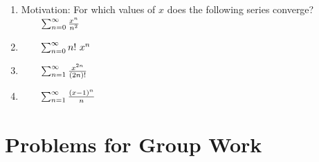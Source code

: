 \documentclass[10pt]{article}
\begin{document}
\begin{enumerate}[{Example }1:]

\item Motivation: For which values of \(x\) does the following series converge?\\
 \( \qquad \sum_{n=0}^\infty \frac{x^n}{n^2}\)
 
 \vfill
 
 \pagebreak


\hspace*{-.75in Find the radius and interval of convergence for the following series:}
\item \( \qquad \Sumzero n!\ x^n\)
\vfill


\item \( \qquad \sum_{n=1}^\infty \frac{x^{2n}}{(2n)!}\)
\vfill

\item \( \qquad \sum_{n=1}^\infty \frac{(x-1)^n}{n}\)
\vfill


%
\vfill
%
\end{enumerate}

\pagebreak

\section*{Problems for Group Work}
\end{document}
